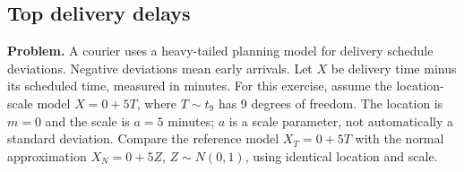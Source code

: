 \subsection{Top delivery delays}
\label{c9-i1}
\textbf{Problem.} A courier uses a heavy-tailed planning model for delivery schedule deviations. Negative deviations mean early arrivals. Let $X$ be delivery time minus its scheduled time, measured in minutes. For this exercise, assume the location-scale model $X=0+5T$, where $T\sim t_{9}$ has 9 degrees of freedom. The location is $m=0$ and the scale is $a=5$ minutes; $a$ is a scale parameter, not automatically a standard deviation. Compare the reference model $X_T=0+5T$ with the normal approximation $X_N=0+5Z$, $Z\sim N(0,1)$, using identical location and scale.
